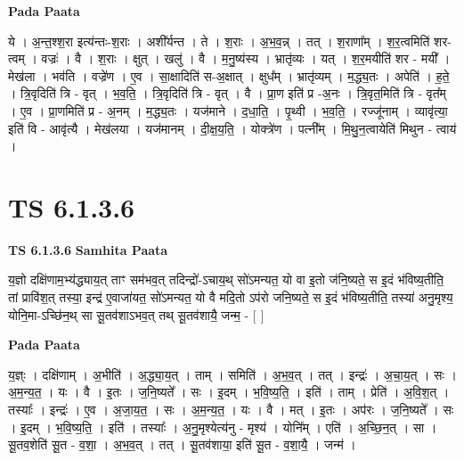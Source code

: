 \documentclass[17pt]{extarticle}
\begin{document}
\textbf{Pada Paata} \newline

ये । अ॒न्त॒श्श॒रा इत्य॑न्तः-श॒राः । अशी᳚र्यन्त । ते । श॒राः । अ॒भ॒व॒न्न् । तत् । श॒राणा᳚म् । श॒र॒त्वमिति॑ शर-त्वम् । वज्रः॑ । वै । श॒राः । क्षुत् । खलु॑ । वै । म॒नु॒ष्य॑स्य । भ्रातृ॑व्यः । यत् । श॒र॒मयीति॑ शर - मयी᳚ । मेख॑ला । भव॑ति । वज्रे॑ण । ए॒व । सा॒क्षादिति॑ स-अ॒क्षात् । क्षुध᳚म् । भ्रातृ॑व्यम् । म॒द्ध्य॒तः । अपेति॑ । ह॒ते॒ । त्रि॒वृदिति॑ त्रि - वृत् । भ॒व॒ति॒ । त्रि॒वृदिति॑ त्रि - वृत् । वै । प्रा॒ण इति॑ प्र -अ॒नः । त्रि॒वृत॒मिति॑ त्रि - वृत᳚म् । ए॒व । प्रा॒णमिति॑ प्र - अ॒नम् । म॒द्ध्य॒तः । यज॑माने । द॒धा॒ति॒ । पृ॒थ्वी । भ॒व॒ति॒ । रज्जू॑नाम् । व्यावृ॑त्या॒ इति॑ वि - आवृ॑त्यै । मेख॑लया । यज॑मानम् । दी॒क्ष॒य॒ति॒ । योक्त्रे॑ण । पत्नी᳚म् । मि॒थु॒न॒त्वायेति॑ मिथुन - त्वाय॑ ।  \newline




\section*{ TS 6.1.3.6 }

\textbf{TS 6.1.3.6 } \newline
\textbf{Samhita Paata} \newline

य॒ज्ञो दक्षि॑णाम॒भ्य॑द्ध्याय॒त् ताꣳ सम॑भव॒त् तदिन्द्रो॑-ऽचाय॒थ् सो॑ऽमन्यत॒ यो वा इ॒तो ज॑नि॒ष्यते॒ स इ॒दं भ॑विष्य॒तीति॒ तां प्रावि॑श॒त् तस्या॒ इन्द्र॑ ए॒वाजा॑यत॒ सो॑ऽमन्यत॒ यो वै मदि॒तो ऽप॑रो जनि॒ष्यते॒ स इ॒दं भ॑विष्य॒तीति॒ तस्या॑ अनु॒मृश्य॒ योनि॒मा-ऽच्छि॑न॒थ् सा सू॒तव॑शाऽभव॒त् तथ् सू॒तव॑शायै॒ जन्म॒ - [  ] \newline

\textbf{Pada Paata} \newline

य॒ज्ञ्ः । दक्षि॑णाम् । अ॒भीति॑ । अ॒द्ध्या॒य॒त् । ताम् । समिति॑ । अ॒भ॒व॒त् । तत् । इन्द्रः॑ । अ॒चा॒य॒त् । सः । अ॒म॒न्य॒त॒ । यः । वै । इ॒तः । ज॒नि॒ष्यते᳚ । सः । इ॒दम् । भ॒वि॒ष्य॒ति॒ । इति॑ । ताम् । प्रेति॑ । अ॒वि॒श॒त् । तस्याः᳚ । इन्द्रः॑ । ए॒व । अ॒जा॒य॒त॒ । सः । अ॒म॒न्य॒त॒ । यः । वै । मत् । इ॒तः । अप॑रः । ज॒नि॒ष्यते᳚ । सः । इ॒दम् । भ॒वि॒ष्य॒ति॒ । इति॑ । तस्याः᳚ । अ॒नु॒मृश्येत्य॑नु - मृश्य॑ । योनि᳚म् । एति॑ । अ॒च्छि॒न॒त् । सा । सू॒तव॒शेति॑ सू॒त - व॒शा॒ । अ॒भ॒व॒त् । तत् । सू॒तव॑शाया॒ इति॑ सू॒त - व॒शा॒यै॒ । जन्म॑ ।  \newline
\end{document}
